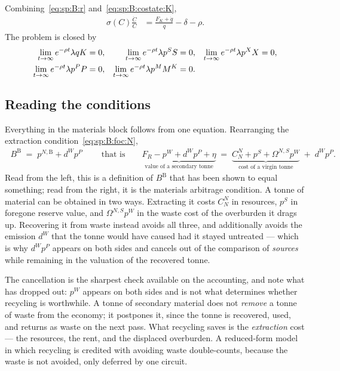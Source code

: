  Combining~\eqref{eq:sp:B:r}
and~\eqref{eq:sp:B:costate:K},
\begin{align}
\sigma\left(C\right)\frac{\dot C}{C} &= \frac{F_K+\dot q}{q}-\delta-\rho .
\label{eq:sp:B:euler}
\end{align}
The problem is closed by
\begin{align}
\lim_{t\to\infty}e^{-\rho t}\lambda q K &= 0,
&
\lim_{t\to\infty}e^{-\rho t}\lambda p^S S &= 0,
&
\lim_{t\to\infty}e^{-\rho t}\lambda p^X X &= 0,
\notag\\
\lim_{t\to\infty}e^{-\rho t}\lambda p^P P &= 0,
&
\lim_{t\to\infty}e^{-\rho t}\lambda p^M M^K &= 0 .
&&
\label{eq:sp:B:tvc}
\end{align}


\subsection{Reading the conditions}\label{sec:sp:B:materials}

 Everything in the materials block follows from one equation.
Rearranging the extraction condition~\eqref{eq:sp:B:foc:N},
\begin{align}
\boxed{\;B^{\mathrm B}\;=\;p^{N,\mathrm B}+d^Wp^P\;}
\qquad\text{that is}\qquad
\underbrace{F_R-p^W+d^Wp^P+\eta}_{\text{value of a secondary tonne}}
\;=\;
\underbrace{C^N_N+p^S+\Omega^{N,S}p^W}_{\text{cost of a virgin tonne}}
\;+\;d^Wp^P .
\label{eq:sp:B:arbitrage}
\end{align}
Read from the left, this is a definition of $B^{\mathrm B}$ that has been shown to equal something; read
from the right, it is the materials arbitrage condition. A tonne of material can be obtained in two
ways. Extracting it costs $C^N_N$ in resources, $p^S$ in foregone reserve value, and $\Omega^{N,S}p^W$
in the waste cost of the overburden it drags up. Recovering it from waste instead avoids all three,
and additionally avoids the emission $d^W$ that the tonne would have caused had it stayed untreated
--- which is why $d^Wp^P$ appears on both sides and cancels out of the comparison of \emph{sources}
while remaining in the valuation of the recovered tonne.

The cancellation is the sharpest check available on the accounting, and note what has dropped out:
$p^W$ appears on both sides and is not what determines whether recycling is worthwhile. A tonne of
secondary material does not \emph{remove} a tonne of waste from the economy; it postpones it, since
the tonne is recovered, used, and returns as waste on the next pass. What recycling saves is the
\emph{extraction} cost --- the resources, the rent, and the displaced overburden. A reduced-form model
in which recycling is credited with avoiding waste double-counts, because the waste is not avoided,
only deferred by one circuit.

